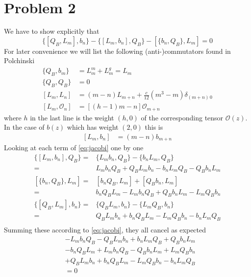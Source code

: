 \documentclass[a4paper,10pt]{article}
\renewcommand\[{\begin{equation*}}
\renewcommand\]{\end{equation*}}
\numberwithin{equation}{section}
\begin{document}
\section*{Problem 2}
We have to show explicitly that
\begin{equation} \label{eq:jacobi}
	\{[Q_B,L_m],b_n\}-\{[L_m,b_n],Q_B\}-[\{b_n,Q_B\},L_m]=0
\end{equation}
For later convenience we will list the following (anti-)commutators found in Polchinski
\begin{equation}
	\begin{aligned}
		\{Q_B,b_m\}&=L_m^m+L_m^g=L_m\\
		\{Q_B,Q_B\}&=0\\
		[L_m,L_n]&=(m-n)L_{m+n}+\frac{c}{12}(m^3-m)\delta_{(m+n)\,0}\\
		[L_m,\mathcal{O}_n]&=[(h-1)m-n]\mathcal{O}_{m+n}
	\end{aligned}
\end{equation}
where $h$ in the last line is the weight $(h,0)$ of the corresponding tensor $\mathcal{O}(z)$. In the case of $b(z)$ which has weight $(2,0)$ this is
\begin{equation}
	\begin{aligned}
		[L_m,b_n]&=(m-n)b_{m+n}
	\end{aligned}
\end{equation}
Looking at each term of \eqref{eq:jacobi} one by one 
\begin{equation}
	\begin{aligned}
		\{[L_m,b_n],Q_B\}=&\{L_mb_n,Q_B\}-\{b_nL_m,Q_B\}\\
		=&L_mb_nQ_B+Q_BL_mb_n-b_nL_mQ_B-Q_Bb_nL_m\\
		[\{b_n,Q_B\},L_m]=&[b_nQ_B,L_m]+[Q_Bb_n,L_m]\\
		=&b_nQ_BL_m-L_mb_nQ_B+Q_Bb_nL_m-L_mQ_Bb_n\\
		\{[Q_B,L_m],b_n\}=&\{Q_BL_m,b_n\}-\{L_mQ_B,b_n\}\\
		=&Q_BL_mb_n+b_nQ_BL_m-L_mQ_Bb_n-b_nL_mQ_B\\
	\end{aligned}
\end{equation}
Summing these according to \eqref{eq:jacobi}, they all cancel as expected
\begin{equation}
	\begin{aligned}
		&-L_mb_nQ_B-Q_BL_mb_n+b_nL_mQ_B+Q_Bb_nL_m\\
		&-b_nQ_BL_m+L_mb_nQ_B-Q_Bb_nL_m+L_mQ_Bb_n\\
		&+Q_BL_mb_n+b_nQ_BL_m-L_mQ_Bb_n-b_nL_mQ_B\\
		&=0
	\end{aligned}
\end{equation}
\end{document}
